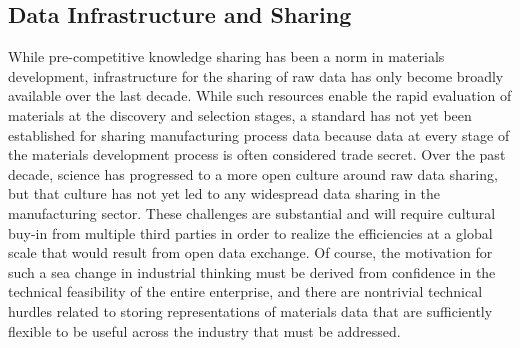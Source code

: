 
\subsection{Data Infrastructure and Sharing}
While pre-competitive knowledge sharing has been a norm in materials development, infrastructure for the sharing of raw data has only become broadly available over the last decade\cite{CitrineInformatics,MP}. 
While such resources enable the rapid evaluation of materials at the discovery and selection stages, a standard has not yet been established for sharing manufacturing process data because data at every stage of the materials development process is often considered trade secret\cite{TheMinerals2013}. 
Over the past decade, science has progressed to a more open culture around raw data sharing, but that culture has not yet led to any widespread data sharing in the manufacturing sector.
These challenges are substantial and will require cultural buy-in from multiple third parties in order to realize the efficiencies at a global scale that would result from open data exchange. 
Of course, the motivation for such a sea change in industrial thinking must be derived from confidence in the technical feasibility of the entire enterprise, and there are nontrivial technical hurdles related to storing representations of materials data that are sufficiently flexible to be useful across the industry that must be addressed. 

